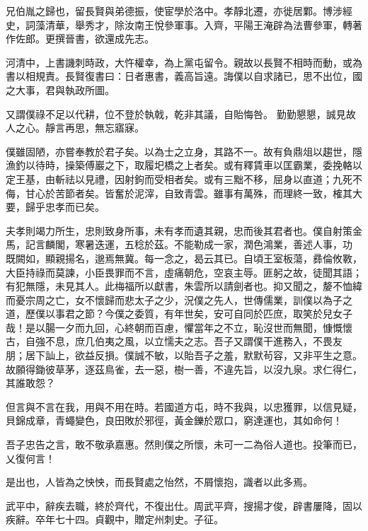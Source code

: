 \begin{pinyinscope}
 兄伯胤之歸也，留長賢與弟德振，使宦學於洛中。孝靜北遷，亦徙居鄴。博涉經史，詞藻清華，舉秀才，除汝南王悅參軍事。入齊，平陽王淹辟為法曹參軍，轉著作佐郎。更撰晉書，欲還成先志。



 河清中，上書譏刺時政，大忤權幸，為上黨屯留令。親故以長賢不相時而動，或為書以相規責。長賢復書曰：日者惠書，義高旨遠。誨僕以自求諸已，思不出位，國之大事，君與執政所圖。



 又謂僕祿不足以代耕，位不登於執戟，乾非其議，自貽悔咎。
 勤勤懇懇，誠見故人之心。靜言再思，無忘寤寐。



 僕雖固陋，亦嘗奉教於君子矣。以為士之立身，其路不一。故有負鼎俎以趨世，隱漁釣以待時，操築傅巖之下，取履圯橋之上者矣。或有釋賃車以匡霸業，委挽輅以定王基，由斬祛以見禮，因射鉤而受相者矣。或有三黜不移，屈身以直道；九死不侮，甘心於苦節者矣。皆奮於泥滓，自致青雲。雖事有萬殊，而理終一致，榷其大要，歸乎忠孝而已矣。



 夫孝則竭力所生，忠則致身所事，未有孝而遺其親，忠而後其君者也。僕自射策金馬，記言麟閣，寒暑迭運，五稔於茲。不能勒成一家，潤色鴻業，善述人事，功
 既闕如，顯親揚名，邈焉無冀。每一念之，曷云其已。自頃王室板蕩，彞倫攸斁，大臣持祿而莫諫，小臣畏罪而不言，虛痛朝危，空哀主辱。匪躬之故，徒聞其語；有犯無隱，未見其人。此梅福所以獻書，朱雲所以請劍者也。抑又聞之，嫠不恤緯而憂宗周之亡，女不懷歸而悲太子之少，況僕之先人，世傳儒業，訓僕以為子之道，歷僕以事君之節？今僕之委質，有年世矣，安可自同於匹庶，取笑於兒女子哉！是以腸一夕而九回，心終朝而百慮，懼當年之不立，恥沒世而無聞，慷慨懷古，自強不息，庶几伯夷之風，以立懦夫之志。吾子又謂僕干進務入，不畏友
 朋；居下訕上，欲益反損。僕誠不敏，以貽吾子之羞，默默茍容，又非平生之意。故願得鋤彼草茅，逐茲鳥雀，去一惡，樹一善，不違先旨，以沒九泉。求仁得仁，其誰敢怨？



 但言與不言在我，用與不用在時。若國道方屯，時不我與，以忠獲罪，以信見疑，貝錦成章，青蠅變色，良田敗於邪徑，黃金鑠於眾口，窮達運也，其如命何！



 吾子忠告之言，敢不敬承嘉惠。然則僕之所懷，未可一二為俗人道也。投筆而已，乂復何言！



 是出也，人皆為之怏怏，而長賢處之怡然，不屑懷抱，識者以此多焉。



 武平中，辭疾去職，終於齊代，不復出仕。周武平齊，搜揚才俊，辟書屢降，固以
 疾辭。卒年七十四。貞觀中，贈定州刺史。子征。




\end{pinyinscope}
